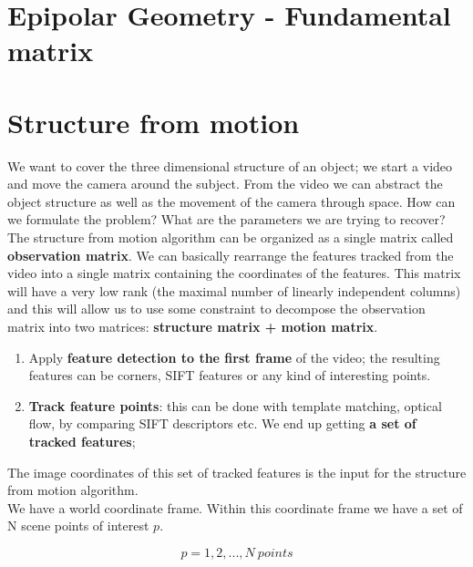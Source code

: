 \documentclass{article}
\begin{document}
\newpage

\section*{Epipolar Geometry - Fundamental matrix}

\newpage 

\section*{Structure from motion}

We want to cover the three dimensional structure of an object; we start a video and move the camera around the subject. From the video we can abstract the object structure as well as the movement of the camera through space. How can we formulate the problem? What are the parameters we are trying to recover?\\

The structure from motion algorithm can be organized as a single matrix called \textbf{observation matrix}. We can basically rearrange the features tracked from the video into a single matrix containing the coordinates of the features. This matrix will have a very low rank (the maximal number of linearly independent columns) and this will allow us to use some constraint to decompose the observation matrix into two matrices: \textbf{structure matrix + motion matrix}. 

\begin{enumerate}
    \item Apply \textbf{feature detection to the first frame} of the video; the resulting features can be corners, SIFT features or any kind of interesting points. 
    \item \textbf{Track feature points}: this can be done with template matching, optical flow, by comparing SIFT descriptors etc. We end up getting \textbf{a set of tracked features};
\end{enumerate}

The image coordinates of this set of tracked features is the input for the structure from motion algorithm. \\

We have a world coordinate frame. Within this coordinate frame we have a set of N scene points of interest $p$.

\begin{equation*}
    p = 1, 2, ..., N\ points
\end{equation*}
\end{document}
